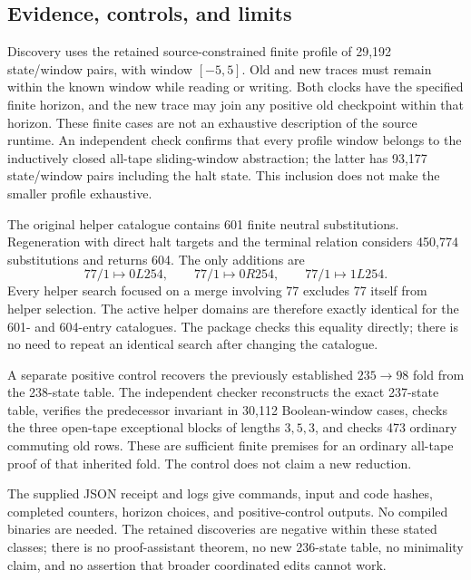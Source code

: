 \subsection{Evidence, controls, and limits}

Discovery uses the retained source-constrained finite profile of 29,192
state/window pairs, with window $[-5,5]$. Old and new traces must remain within
the known window while reading or writing. Both clocks have the specified
finite horizon, and the new trace may join any positive old checkpoint within
that horizon. These finite cases are not an exhaustive description of the
source runtime. An independent check confirms that every profile window belongs
to the inductively closed all-tape sliding-window abstraction; the latter has
93,177 state/window pairs including the halt state. This inclusion does not
make the smaller profile exhaustive.

The original helper catalogue contains 601 finite neutral substitutions.
Regeneration with direct halt targets and the terminal relation considers
450,774 substitutions and returns 604. The only additions are
\[
 77/1\mapsto0L254,\qquad77/1\mapsto0R254,\qquad77/1\mapsto1L254.
\]
Every helper search focused on a merge involving 77 excludes 77 itself from
helper selection. The active helper domains are therefore exactly identical
for the 601- and 604-entry catalogues. The package checks this equality directly;
there is no need to repeat an identical search after changing the catalogue.

A separate positive control recovers the previously established $235\to98$
fold from the 238-state table. The independent checker reconstructs the exact
237-state table, verifies the predecessor invariant in 30,112 Boolean-window
cases, checks the three open-tape exceptional blocks of lengths $3,5,3$, and
checks 473 ordinary commuting old rows. These are sufficient finite premises
for an ordinary all-tape proof of that inherited fold. The control does not
claim a new reduction.

The supplied JSON receipt and logs give commands, input and code hashes,
completed counters, horizon choices, and positive-control outputs. No compiled
binaries are needed. The retained discoveries are negative within these stated
classes; there is no proof-assistant theorem, no new 236-state table, no
minimality claim, and no assertion that broader coordinated edits cannot work.
